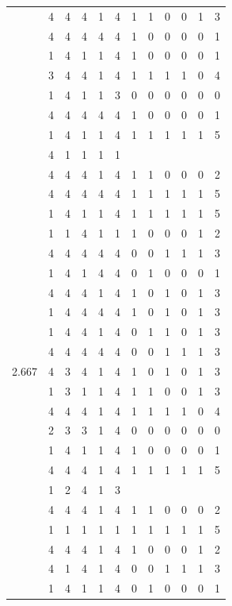 \documentclass[]{msu-thesis}
\theoremstyle{definition}
\theoremstyle{definition}
\theoremstyle{definition}
\theoremstyle{remark}
\begin{document}
\begin{table}
{\begin{tabular}[t]{rrrrrrrrrrrr}
 & 4 & 4 & 4 & 1 & 4 & 1 & 1 & 0 & 0 & 1 & 3\\
 & 4 & 4 & 4 & 4 & 4 & 1 & 0 & 0 & 0 & 0 & 1\\
 & 1 & 4 & 1 & 1 & 4 & 1 & 0 & 0 & 0 & 0 & 1\\
 & 3 & 4 & 4 & 1 & 4 & 1 & 1 & 1 & 1 & 0 & 4\\
 & 1 & 4 & 1 & 1 & 3 & 0 & 0 & 0 & 0 & 0 & 0\\
 & 4 & 4 & 4 & 4 & 4 & 1 & 0 & 0 & 0 & 0 & 1\\
 & 1 & 4 & 1 & 1 & 4 & 1 & 1 & 1 & 1 & 1 & 5\\
 & 4 & 1 & 1 & 1 & 1 &  &  &  &  &  & \\
 & 4 & 4 & 4 & 1 & 4 & 1 & 1 & 0 & 0 & 0 & 2\\
 & 4 & 4 & 4 & 4 & 4 & 1 & 1 & 1 & 1 & 1 & 5\\
 & 1 & 4 & 1 & 1 & 4 & 1 & 1 & 1 & 1 & 1 & 5\\
 & 1 & 1 & 4 & 1 & 1 & 1 & 0 & 0 & 0 & 1 & 2\\
 & 4 & 4 & 4 & 4 & 4 & 0 & 0 & 1 & 1 & 1 & 3\\
 & 1 & 4 & 1 & 4 & 4 & 0 & 1 & 0 & 0 & 0 & 1\\
 & 4 & 4 & 4 & 1 & 4 & 1 & 0 & 1 & 0 & 1 & 3\\
 & 1 & 4 & 4 & 4 & 4 & 1 & 0 & 1 & 0 & 1 & 3\\
 & 1 & 4 & 4 & 1 & 4 & 0 & 1 & 1 & 0 & 1 & 3\\
 & 4 & 4 & 4 & 4 & 4 & 0 & 0 & 1 & 1 & 1 & 3\\
2.667 & 4 & 3 & 4 & 1 & 4 & 1 & 0 & 1 & 0 & 1 & 3\\
 & 1 & 3 & 1 & 1 & 4 & 1 & 1 & 0 & 0 & 1 & 3\\
 & 4 & 4 & 4 & 1 & 4 & 1 & 1 & 1 & 1 & 0 & 4\\
 & 2 & 3 & 3 & 1 & 4 & 0 & 0 & 0 & 0 & 0 & 0\\
 & 1 & 4 & 1 & 1 & 4 & 1 & 0 & 0 & 0 & 0 & 1\\
 & 4 & 4 & 4 & 1 & 4 & 1 & 1 & 1 & 1 & 1 & 5\\
 & 1 & 2 & 4 & 1 & 3 &  &  &  &  &  & \\
 & 4 & 4 & 4 & 1 & 4 & 1 & 1 & 0 & 0 & 0 & 2\\
 & 1 & 1 & 1 & 1 & 1 & 1 & 1 & 1 & 1 & 1 & 5\\
 & 4 & 4 & 4 & 1 & 4 & 1 & 0 & 0 & 0 & 1 & 2\\
 & 4 & 1 & 4 & 1 & 4 & 0 & 0 & 1 & 1 & 1 & 3\\
 & 1 & 4 & 1 & 1 & 4 & 0 & 1 & 0 & 0 & 0 & 1\\

\end{tabular}}
\end{table}
\end{document}
